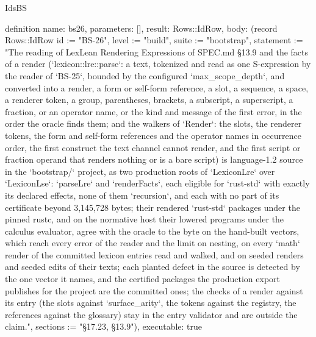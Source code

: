 \begin{lexlean}{IdsBS}
\begin{semanticmodule}
definition{
  name: bs26,
  parameters: [],
  result: Rows::IdRow,
  body: (record Rows::IdRow {id := "BS-26", level := "build", suite := "bootstrap", statement := "The reading of LexLean Rendering Expressions of SPEC.md §13.9 and the facts of a render (`lexicon::lre::parse`: a text, tokenized and read as one S-expression by the reader of `BS-25`, bounded by the configured `max_scope_depth`, and converted into a render, a form or self-form reference, a slot, a sequence, a space, a renderer token, a group, parentheses, brackets, a subscript, a superscript, a fraction, or an operator name, or the kind and message of the first error, in the order the oracle finds them; and the walkers of `Render`: the slots, the renderer tokens, the form and self-form references and the operator names in occurrence order, the first construct the text channel cannot render, and the first script or fraction operand that renders nothing or is a bare script) is language-1.2 source in the `bootstrap/` project, as two production roots of `LexiconLre` over `LexiconLse`: `parseLre` and `renderFacts`, each eligible for `rust-std` with exactly its declared effects, none of them `recursion`, and each with no part of its certificate beyond 3,145,728 bytes; their rendered `rust-std` packages under the pinned rustc, and on the normative host their lowered programs under the calculus evaluator, agree with the oracle to the byte on the hand-built vectors, which reach every error of the reader and the limit on nesting, on every `math` render of the committed lexicon entries read and walked, and on seeded renders and seeded edits of their texts; each planted defect in the source is detected by the one vector it names, and the certified packages the production export publishes for the project are the committed ones; the checks of a render against its entry (the slots against `surface_arity`, the tokens against the registry, the references against the glossary) stay in the entry validator and are outside the claim.", sections := "§17.23, §13.9"}),
  executable: true
}


\end{semanticmodule}
\end{lexlean}

